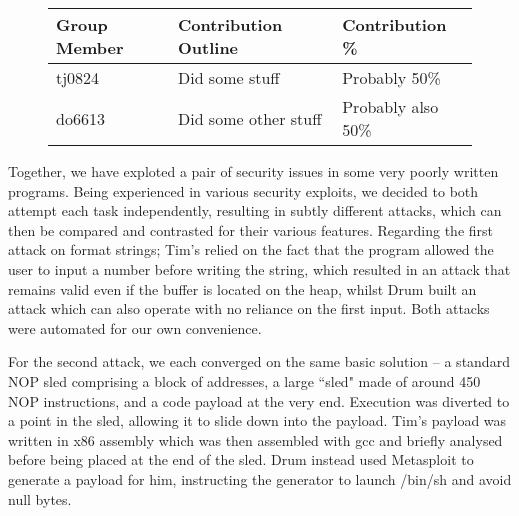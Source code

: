 \begin{figure}[h]
\centering
\begin{tabular}{|l|l|l|}
\hline
{\bf Group Member} & {\bf Contribution Outline} & {\bf Contribution \%} \\
\hline
tj0824 & Did some stuff & Probably 50\% \\
do6613 & Did some other stuff & Probably also 50\% \\
\hline
\end{tabular}
\end{figure}

Together, we have exploted a pair of security issues in some very poorly written programs. Being experienced in various
security exploits, we decided to both attempt each task independently, resulting in subtly different attacks, which can
then be compared and contrasted for their various features. Regarding the first attack on format strings; Tim's relied
on the fact that the program allowed the user to input a number before writing the string, which resulted in an attack
that remains valid even if the buffer is located on the heap, whilst Drum built an attack which can also operate with
no reliance on the first input. Both attacks were automated for our own convenience.

For the second attack, we each converged on the same basic solution -- a standard NOP sled comprising a block of
addresses, a large ``sled" made of around 450 NOP instructions, and a code payload at the very end. Execution was
diverted to a point in the sled, allowing it to slide down into the payload. Tim's payload was written in x86 assembly
which was then assembled with gcc and briefly analysed before being placed at the end of the sled. Drum instead used
Metasploit to generate a payload for him, instructing the generator to launch /bin/sh and avoid null bytes.

